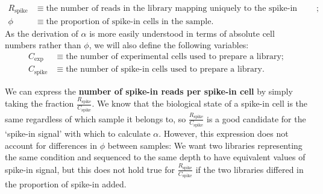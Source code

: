 \begin{align*}
    R_{\text{spike}} &\equiv \text{the number of reads in the library mapping uniquely to the spike-in genome}; \\
    \phi &\equiv \text{the proportion of spike-in cells in the sample}.
\end{align*}
As the derivation of $\alpha$ is more easily understood in terms of absolute cell numbers rather than $\phi$, we will also define the following variables:
\begin{align*}
    C_{\text{exp}} &\equiv \text{the number of experimental cells used to prepare a library}; \\
    C_{\text{spike}} &\equiv \text{the number of spike-in cells used to prepare a library}.
\end{align*}

We can express the \textbf{number of spike-in reads per spike-in cell} by simply taking the fraction $\frac{R_{\text{spike}}}{C_{\text{spike}}}$.
We know that the biological state of a spike-in cell is the same regardless of which sample it belongs to, so $\frac{R_{\text{spike}}}{C_{\text{spike}}}$ is a good candidate for the `spike-in signal' with which to calculate $\alpha$.
However, this expression does not account for differences in $\phi$ between samples: We want two libraries representing the same condition and sequenced to the same depth to have equivalent values of spike-in signal, but this does not hold true for $\frac{R_{\text{spike}}}{C_{\text{spike}}}$ if the two libraries differed in the proportion of spike-in added.

